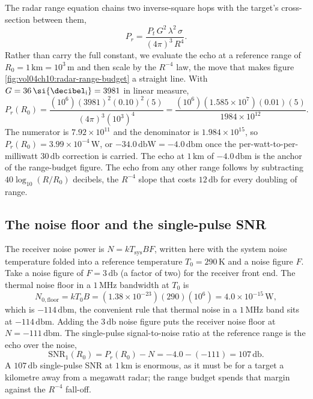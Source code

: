 The radar range equation chains two inverse-square hops with the target's
cross-section between them,
\[
P_{r} = \frac{P_{t}\, G^{2}\, \lambda^{2}\, \sigma}{(4\pi)^{3}\, R^{4}}.
\]
Rather than carry the full constant, we evaluate the echo at a reference
range of $R_{0} = 1\,\si{\kilo\meter} = 10^{3}\,\si{\meter}$ and then
scale by the $R^{-4}$ law, the move that makes figure
\ref{fig:vol04ch10:radar-range-budget} a straight line. With $G = 36\,
\si{\decibel\textsubscript{i}} = 3981$ in linear measure,
\[
P_{r}(R_{0}) = \frac{(10^{6})(3981)^{2}(0.10)^{2}(5)}{(4\pi)^{3}(10^{3})
^{4}} = \frac{(10^{6})(1.585\times 10^{7})(0.01)(5)}{1984\times 10^{12}}.
\]
The numerator is $7.92\times 10^{11}$ and the denominator is $1.984\times
10^{15}$, so $P_{r}(R_{0}) = 3.99\times 10^{-4}\,\si{\watt}$, or
$-34.0\,\si{\decibel}\text{W} = -4.0\,\si{\decibel}\text{m}$ once the
per-watt-to-per-milliwatt $30\,\si{\decibel}$ correction is carried. The
echo at $1\,\si{\kilo\meter}$ of $-4.0\,\si{\decibel}\text{m}$ is the
anchor of the range-budget figure. The echo from any
other range follows by subtracting $40\log_{10}(R/R_{0})$ decibels, the
$R^{-4}$ slope that costs $12\,\si{\decibel}$ for every doubling of range.

\subsection{The noise floor and the single-pulse SNR}

The receiver noise power is $N = k T_{\mathrm{sys}} B F$, written here with
the system noise temperature folded into a reference temperature
$T_{0} = 290\,\si{\kelvin}$ and a noise figure $F$. Take a noise figure of
$F = 3\,\si{\decibel}$ (a factor of two) for the receiver front end. The
thermal noise floor in a $1\,\si{\mega\hertz}$ bandwidth at $T_{0}$ is
\[
N_{0,\mathrm{floor}} = k T_{0} B = (1.38\times 10^{-23})(290)(10^{6}) =
4.0\times 10^{-15}\,\si{\watt},
\]
which is $-114\,\si{\decibel}\text{m}$, the convenient rule that thermal
noise in a $1\,\si{\mega\hertz}$ band sits at $-114\,\si{\decibel}\text{m}$.
Adding the $3\,\si{\decibel}$ noise figure puts the receiver noise floor at
$N = -111\,\si{\decibel}\text{m}$. The single-pulse signal-to-noise ratio
at the reference range is the echo over the noise,
\[
\text{SNR}_{1}(R_{0}) = P_{r}(R_{0}) - N = -4.0 - (-111) = 107\,\si{
\decibel}.
\]
A $107\,\si{\decibel}$ single-pulse SNR at $1\,\si{\kilo\meter}$ is
enormous, as it must be for a target a kilometre away from a megawatt
radar; the range budget spends that margin against the $R^{-4}$ fall-off.

